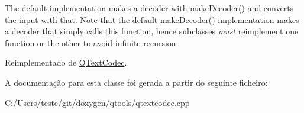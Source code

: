 The default implementation makes a decoder with \hyperlink{class_q_text_codec_from_i_o_d_a44f8e6491b9114c4278d8dfb197e951d}{make\-Decoder()} and converts the input with that. Note that the default \hyperlink{class_q_text_codec_from_i_o_d_a44f8e6491b9114c4278d8dfb197e951d}{make\-Decoder()} implementation makes a decoder that simply calls this function, hence subclasses {\itshape must} reimplement one function or the other to avoid infinite recursion. 

Reimplementado de \hyperlink{class_q_text_codec_a007974789d47a38acb95816cd5486c8c}{Q\-Text\-Codec}.



A documentação para esta classe foi gerada a partir do seguinte ficheiro\-:\begin{DoxyCompactItemize}
\item 
C\-:/\-Users/teste/git/doxygen/qtools/qtextcodec.\-cpp\end{DoxyCompactItemize}
